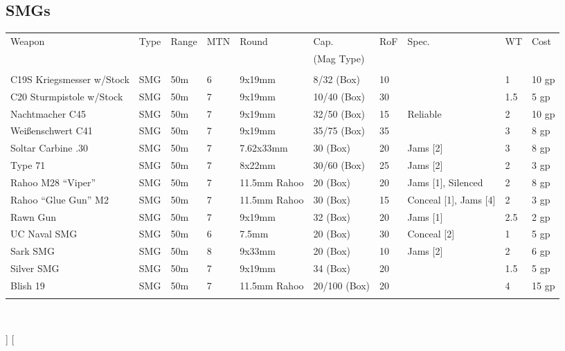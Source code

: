 \documentclass[a4paper, twocolumn, openany]{book}
\begin{document}
{{	%
	\subsection{SMGs}

	{\centering
	\begin{tabular}{p{2.5cm}lllp{2cm}llp{2cm}ll}
	Weapon & Type & Range & MTN & Round & Cap. & RoF & Spec. & WT & Cost\\ 
	&&&&& (Mag Type) \\ \hline \\
	C19S Kriegsmesser w/Stock 	 & SMG & 50m & 6 & 9x19mm 			& 8/32 (Box) 	& 10 & 							& 1 	& 10 gp \\
	C20 Sturmpistole w/Stock 	 & SMG & 50m & 7 & 9x19mm 			& 10/40 (Box) 	& 30 & 							& 1.5 	& 5 gp 	\\
	Nachtmacher C45 			 & SMG & 50m & 7 & 9x19mm 			& 32/50 (Box) 	& 15 & Reliable 				& 2 	& 10 gp \\
	Weißenschwert C41 			 & SMG & 50m & 7 & 9x19mm 			& 35/75 (Box) 	& 35 & 							& 3 	& 8 gp 	\\
	Soltar Carbine .30 			 & SMG & 50m & 7 & 7.62x33mm 		& 30 (Box) 		& 20 & Jams [2] 				& 3 	& 8 gp 	\\
	Type 71 					 & SMG & 50m & 7 & 8x22mm 			& 30/60 (Box) 	& 25 & Jams [2] 				& 2 	& 3 gp 	\\
	Rahoo M28 “Viper” 			 & SMG & 50m & 7 & 11.5mm \newline Rahoo 	& 20 (Box) 		& 20 & Jams [1], \newline Silenced 		& 2 	& 8 gp 	\\
	Rahoo “Glue Gun” M2 		 & SMG & 50m & 7 & 11.5mm \newline Rahoo 	& 30 (Box) 		& 15 & Conceal [1], Jams [4] 	& 2 	& 3 gp 	\\
	Rawn Gun 					 & SMG & 50m & 7 & 9x19mm 			& 32 (Box) 		& 20 & Jams [1] 				& 2.5 	& 2 gp 	\\
	UC Naval SMG 				 & SMG & 50m & 6 & 7.5mm 			& 20 (Box) 		& 30 & Conceal [2] 				& 1 	& 5 gp 	\\
	Sark SMG 					 & SMG & 50m & 8 & 9x33mm 			& 20 (Box) 		& 10 & Jams [2] 				& 2 	& 6 gp 	\\
	Silver SMG 					 & SMG & 50m & 7 & 9x19mm 			& 34 (Box) 		& 20 & 							& 1.5 	& 5 gp 	\\
	Blish 19 					 & SMG & 50m & 7 & 11.5mm \newline Rahoo 	& 20/100 (Box) 	& 20 & 							& 4 	& 15 gp \\
	\\ \hline
	\end{tabular}\\[2\baselineskip] }
}]
\twocolumn[{
}}
\end{document}
